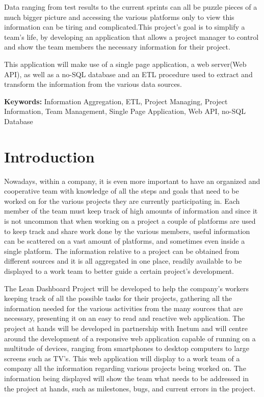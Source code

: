 \documentclass[a4paper,twoside,10pt]{report}
\begin{document}
Data ranging from test results to the current sprints can all be puzzle pieces of a much bigger picture and accessing the various platforms only to view this information can be tiring and complicated.This project's goal is to simplify a team's life, by developing an application that allows a project manager to control and show the team members the necessary information for their project.

This application will make use of a single page application, a web server(Web API), as well as a no-SQL database and an ETL procedure used to extract and transform the information from the various data sources.


\textbf{Keywords:} Information Aggregation, ETL, Project Managing, Project Information, Team Management, Single Page Application, Web API, no-SQL Database


\newpage
\tableofcontents{}
\newpage

\chapter{Introduction}

Nowadays, within a company, it is even more important to have an organized and cooperative team with knowledge of all the steps and goals that need to be worked on for the various projects they are currently participating in.
Each member of the team must keep track of high amounts of information and since it is not uncommon that when working on a project a couple of platforms are used to keep track and share work done by the various members, useful information can be scattered on a vast amount of platforms, and sometimes even inside a single platform.
The information relative to a project can be obtained from different sources and it is all aggregated in one place, readily available to be displayed to a work team to better guide a certain project's development.

The Lean Dashboard Project will be developed to help the company's workers keeping track of all the possible tasks for their projects, gathering all the information needed for the various activities from the many sources that are necessary, presenting it on an easy to read and reactive web application.
The project at hands will be developed in partnership with Inetum\cite{INETUM} and will centre around the development of a responsive web application capable of running on a multitude of devices, ranging from smartphones to desktop computers to large screens such as TV’s. This web application will display to a work team of a company all the information regarding various projects being worked on. 
The information being displayed will show the team what needs to be addressed in the project at hands, such as milestones, bugs, and current errors in the project.
\end{document}
